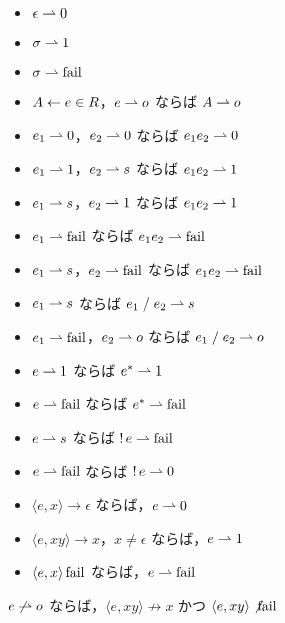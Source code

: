 \begin{itemize}
  \item $\epsilon \rightharpoonup 0$
  \item $\sigma \rightharpoonup 1$
  \item $\sigma \rightharpoonup \mathop{\mathrm{fail}}$
  \item $A \gets e \in R$，$e \rightharpoonup o$ ならば $A \rightharpoonup o$
  \item $e_1 \rightharpoonup 0$，$e_2 \rightharpoonup 0$ ならば $e_1e_2 \rightharpoonup 0$
  \item $e_1 \rightharpoonup 1$，$e_2 \rightharpoonup s$ ならば $e_1e_2 \rightharpoonup 1$
  \item $e_1 \rightharpoonup s$，$e_2 \rightharpoonup 1$ ならば $e_1e_2 \rightharpoonup 1$
  \item $e_1 \rightharpoonup \mathop{\mathrm{fail}}$ ならば $e_1e_2 \rightharpoonup \mathop{\mathrm{fail}}$
  \item $e_1 \rightharpoonup s$，$e_2 \rightharpoonup \mathop{\mathrm{fail}}$ ならば $e_1e_2 \rightharpoonup \mathop{\mathrm{fail}}$
  \item $e_1 \rightharpoonup s$ ならば $e_1 \mathrel{/} e_2 \rightharpoonup s$
  \item $e_1 \rightharpoonup \mathop{\mathrm{fail}}$，$e_2 \rightharpoonup o$ ならば $e_1 \mathrel{/} e_2 \rightharpoonup o$
  \item $e \rightharpoonup 1$ ならば $e^* \rightharpoonup 1$
  \item $e \rightharpoonup \mathop{\mathrm{fail}}$ ならば $e^* \rightharpoonup \mathop{\mathrm{fail}}$
  \item $e \rightharpoonup s$ ならば $\mathop{!} e \rightharpoonup \mathop{\mathrm{fail}}$
  \item $e \rightharpoonup \mathop{\mathrm{fail}}$ ならば $\mathop{!} e \rightharpoonup 0$
\end{itemize}

\begin{theorem}
  \hwordspace{}
  \begin{itemize}
    \item $\langle e, x\rangle \to \epsilon$ ならば，$e \rightharpoonup 0$
    \item $\langle e, xy\rangle \to x$，$x \neq \epsilon$ ならば，$e \rightharpoonup 1$
    \item $\langle e, x\rangle \mathop{\mathrm{fail}}$ ならば，$e \rightharpoonup \mathop{\mathrm{fail}}$
  \end{itemize}
\end{theorem}

\begin{corollary}
  $e \not\rightharpoonup o$ ならば，$\langle e, xy\rangle \not\to x$ かつ $\langle e, xy\rangle \not{\mathop{\mathrm{fail}}}$
\end{corollary}
